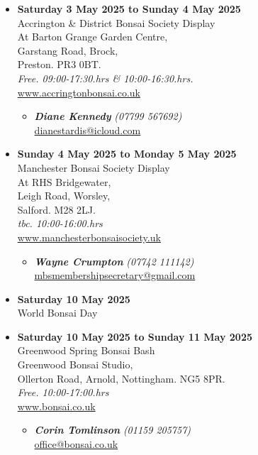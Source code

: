 \begin{itemize}
    \item \textbf{Saturday 3 May 2025 to Sunday 4 May 2025}
    \\
    Accrington \& District Bonsai Society Display \\
    At Barton Grange Garden Centre, \\
    Garstang Road, Brock, \\
    Preston. PR3 0BT.
    \\
    \emph{Free. 09:00-17:30.hrs \& 10:00-16:30.hrs.}
    \\
    \href{https://www.accringtonbonsai.co.uk}{www.accringtonbonsai.co.uk}
    \begin{itemize}
        \item \textbf{\emph{Diane Kennedy}} \emph{(07799 567692)} \\
        \href{mailto:dianestardis@icloud.com}{dianestardis@icloud.com} 
    \end{itemize}

    \item \textbf{Sunday 4 May 2025 to Monday 5 May 2025}
    \\
    Manchester Bonsai Society Display \\
    At RHS Bridgewater, \\
    Leigh Road, Worsley, \\
    Salford. M28 2LJ.
    \\
    \emph{tbc. 10:00-16:00.hrs}
    \\
    \href{https://www.manchesterbonsaisociety.uk}{www.manchesterbonsaisociety.uk}
    \begin{itemize}
        \item \textbf{\emph{Wayne Crumpton}} \emph{(07742 111142)} \\
        \href{mailto:mbsmembershipsecretary@gmail.com}{mbsmembershipsecretary@gmail.com} 
    \end{itemize}

    \item \textbf{Saturday 10 May 2025}
    \\
    World Bonsai Day

    \item \textbf{Saturday 10 May 2025 to Sunday 11 May 2025}
    \\
    Greenwood Spring Bonsai Bash \\
    Greenwood Bonsai Studio, \\
    Ollerton Road, Arnold, Nottingham. NG5 8PR.
    \\
    \emph{Free. 10:00-17:00.hrs}
    \\
    \href{https://www.bonsai.co.uk}{www.bonsai.co.uk}
    \begin{itemize}
        \item \textbf{\emph{Corin Tomlinson}} \emph{(01159 205757)} \\
        \href{mailto:office@bonsai.co.uk}{office@bonsai.co.uk} 
    \end{itemize}


\end{itemize}
